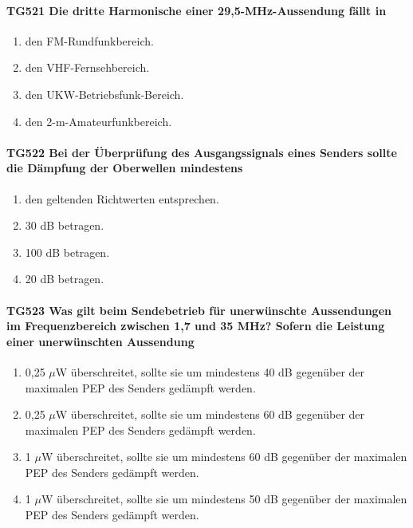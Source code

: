\documentclass[8pt]{article}
\begin{document}
\paragraph*{TG521 Die dritte Harmonische einer 29,5-MHz-Aussendung fällt in} 
\begin{enumerate}[nolistsep,label=\Alph*]
\item den FM-Rundfunkbereich.
\item den VHF-Fernsehbereich.
\item den UKW-Betriebsfunk-Bereich.
\item den 2-m-Amateurfunkbereich.
\end{enumerate}

\paragraph*{TG522 Bei der Überprüfung des Ausgangssignals eines Senders sollte die Dämpfung der Oberwellen mindestens}
\begin{enumerate}[nolistsep,label=\Alph*]
\item den geltenden Richtwerten entsprechen.
\item 30 dB betragen.
\item 100 dB betragen.
\item 20 dB betragen.
\end{enumerate}

\paragraph*{TG523 Was gilt beim Sendebetrieb für unerwünschte Aussendungen im Frequenzbereich zwischen 1,7 und 35 MHz? Sofern die Leistung einer unerwünschten Aussendung}
\begin{enumerate}[nolistsep,label=\Alph*]
\item 0,25 $\mu$W überschreitet, sollte sie um mindestens 40 dB gegenüber der maximalen PEP des Senders gedämpft werden.
\item 0,25 $\mu$W überschreitet, sollte sie um mindestens 60 dB gegenüber der maximalen PEP des Senders gedämpft werden.
\item 1 $\mu$W überschreitet, sollte sie um mindestens 60 dB gegenüber der maximalen PEP des Senders gedämpft werden.
\item 1 $\mu$W überschreitet, sollte sie um mindestens 50 dB gegenüber der maximalen PEP des Senders gedämpft werden.
\end{enumerate}
\end{document}
